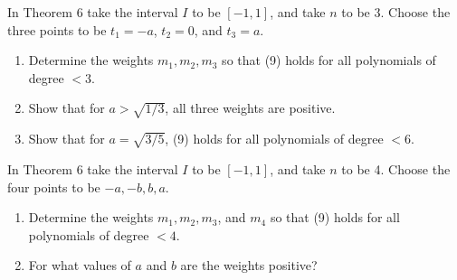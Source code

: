   \begin{exercise}[Lax 2.4] 
    In Theorem 6 take the interval $I$ to be $[-1, 1]$, and take $n$ to be 3. Choose the three points to be $t_1 = -a$, $t_2 = 0$, and $t_3 = a$.
    
    \begin{enumerate}
      \item[(i)] Determine the weights $m_1, m_2, m_3$ so that (9) holds for all polynomials of degree $<3$.
      \item[(ii)] Show that for $a > \sqrt{1/3}$, all three weights are positive.
      \item[(iii)] Show that for $a = \sqrt{3/5}$, (9) holds for all polynomials of degree $<6$.
    \end{enumerate}
  \end{exercise}

  \begin{exercise}[Lax 2.5] 
    In Theorem 6 take the interval $I$ to be $[-1, 1]$, and take $n$ to be 4. Choose the four points to be $-a, -b, b, a$.
    
    \begin{enumerate}
      \item[(i)] Determine the weights $m_1, m_2, m_3$, and $m_4$ so that (9) holds for all polynomials of degree $<4$.
      \item[(ii)] For what values of $a$ and $b$ are the weights positive?
    \end{enumerate}
  \end{exercise}

